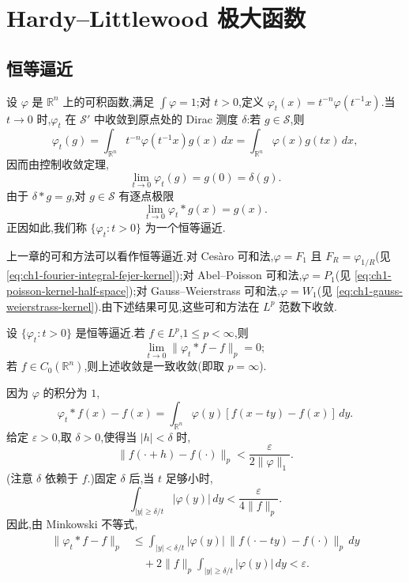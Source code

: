 \setcounter{section}{1}
\section{Hardy--Littlewood 极大函数}
\label{chap:hardy-littlewood-maximal-function}

\hypertarget{sample-page-037}{}
\subsection{恒等逼近}
\label{sec:ch2-identity-approximations}

设 $\varphi$ 是 $\mathbb{R}^n$ 上的可积函数,满足 $\int\varphi=1$;对 $t>0$,定义
$\varphi_t(x)=t^{-n}\varphi(t^{-1}x)$.当 $t\to0$ 时,$\varphi_t$ 在 $\mathcal S'$ 中收敛到原点处的 Dirac 测度 $\delta$:若 $g\in\mathcal S$,则
\[
 \varphi_t(g)=\int_{\mathbb R^n}t^{-n}\varphi(t^{-1}x)g(x)\,dx
 =\int_{\mathbb R^n}\varphi(x)g(tx)\,dx,
\]
因而由控制收敛定理,
\[
 \lim_{t\to0}\varphi_t(g)=g(0)=\delta(g).
\]
由于 $\delta*g=g$,对 $g\in\mathcal S$ 有逐点极限
\[
 \lim_{t\to0}\varphi_t*g(x)=g(x).
\]
正因如此,我们称 $\{\varphi_t:t>0\}$ 为一个恒等逼近.

上一章的可和方法可以看作恒等逼近.对 Cesàro 可和法,$\varphi=F_1$ 且 $F_R=\varphi_{1/R}$(见 \eqref{eq:ch1-fourier-integral-fejer-kernel});对 Abel--Poisson 可和法,$\varphi=P_1$(见 \eqref{eq:ch1-poisson-kernel-half-space});对 Gauss--Weierstrass 可和法,$\varphi=W_1$(见 \eqref{eq:ch1-gauss-weierstrass-kernel}).由下述结果可见,这些可和方法在 $L^p$ 范数下收敛.

\begin{Theorem}
\label{thm:ch2-approximation-identity-lp}
设 $\{\varphi_t:t>0\}$ 是恒等逼近.若 $f\in L^p$,$1\le p<\infty$,则
\[
 \lim_{t\to0}\|\varphi_t*f-f\|_p=0;
\]
若 $f\in C_0(\mathbb R^n)$,则上述收敛是一致收敛(即取 $p=\infty$).
\end{Theorem}

\hypertarget{sample-page-038}{}
\begin{Proof}
因为 $\varphi$ 的积分为 $1$,
\[
 \varphi_t*f(x)-f(x)=\int_{\mathbb R^n}\varphi(y)[f(x-ty)-f(x)]\,dy.
\]
给定 $\varepsilon>0$,取 $\delta>0$,使得当 $|h|<\delta$ 时,
\[
 \|f(\cdot+h)-f(\cdot)\|_p<\frac{\varepsilon}{2\|\varphi\|_1}.
\]
(注意 $\delta$ 依赖于 $f$.)固定 $\delta$ 后,当 $t$ 足够小时,
\[
 \int_{|y|\ge\delta/t}|\varphi(y)|\,dy<\frac{\varepsilon}{4\|f\|_p}.
\]
因此,由 Minkowski 不等式,
\[
\begin{aligned}
 \|\varphi_t*f-f\|_p
 &\le \int_{|y|<\delta/t}|\varphi(y)|\,
       \|f(\cdot-ty)-f(\cdot)\|_p\,dy\\
 &\quad+2\|f\|_p\int_{|y|\ge\delta/t}|\varphi(y)|\,dy
 <\varepsilon.
\end{aligned}
\]
\end{Proof}

